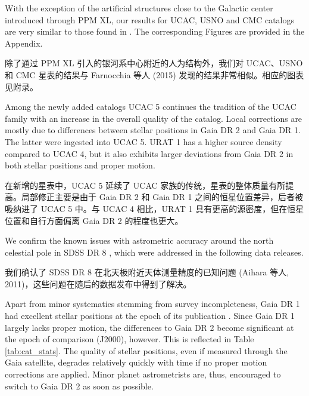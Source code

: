 \documentclass[review]{elsarticle}
\begin{document}

With the exception of the artificial structures close to the Galactic center introduced through PPM XL, our results for UCAC, USNO and CMC catalogs are very similar to those found in \citet{farnocchia15}. 
The corresponding Figures are provided in the Appendix.

除了通过 PPM XL 引入的银河系中心附近的人为结构外，我们对 UCAC、USNO 和 CMC 星表的结果与 Farnocchia 等人 (2015) 发现的结果非常相似。相应的图表见附录。

%
Among the newly added catalogs UCAC 5 continues the tradition of the UCAC family with an increase in the overall quality of the catalog. Local corrections are mostly due to differences between stellar positions in Gaia DR 2 and Gaia DR 1. The latter were ingested into UCAC 5. URAT 1 has a higher source density compared to UCAC 4, but it also exhibits larger deviations from Gaia DR 2 in both stellar positions and proper motion. 

在新增的星表中，UCAC 5 延续了 UCAC 家族的传统，星表的整体质量有所提高。局部修正主要是由于 Gaia DR 2 和 Gaia DR 1 之间的恒星位置差异，后者被吸纳进了 UCAC 5 中。与 UCAC 4 相比，URAT 1 具有更高的源密度，但在恒星位置和自行方面偏离 Gaia DR 2 的程度也更大。

%
We confirm the known issues with astrometric accuracy around the north celestial pole in SDSS DR 8 \citep{sdss8_astrometry}, which were addressed in the following data releases.  

我们确认了 SDSS DR 8 在北天极附近天体测量精度的已知问题 (Aihara 等人, 2011)，这些问题在随后的数据发布中得到了解决。

%
Apart from minor systematics stemming from survey incompleteness, Gaia DR 1 had excellent stellar positions at the epoch of its publication \citep{gaiadr1}. Since Gaia DR 1 largely lacks proper motion, the differences to Gaia DR 2 become significant at the epoch of comparison (J2000), however. This is reflected in Table \ref{tab:cat_stats}. The quality of stellar positions, even if measured through the Gaia satellite, degrades relatively quickly with time if no proper motion corrections are applied. Minor planet astrometrists are, thus, encouraged to switch to Gaia DR 2 as soon as possible. 
\end{document}

